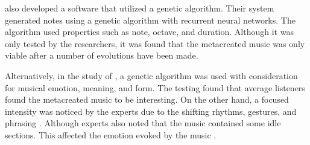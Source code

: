 
\citet{yiiksel2011automatic} also developed a software that utilized a genetic algorithm. Their system generated notes using a genetic algorithm with recurrent neural networks. The algorithm used properties such as note, octave, and duration. Although it was only tested by the researchers, it was found that the metacreated music was only viable after a number of evolutions have been made. 


Alternatively, in the study of \citet{birchfield2003generative}, a genetic algorithm was used with consideration for musical emotion, meaning, and form. The testing found that average listeners found the metacreated music to be interesting. On the other hand, a focused intensity was noticed by the experts due to the shifting rhythms, gestures, and phrasing \citep{birchfield2003generative}. Although experts also noted that the music contained some idle sections. This affected the emotion evoked by the music \citep{birchfield2003generative}.


